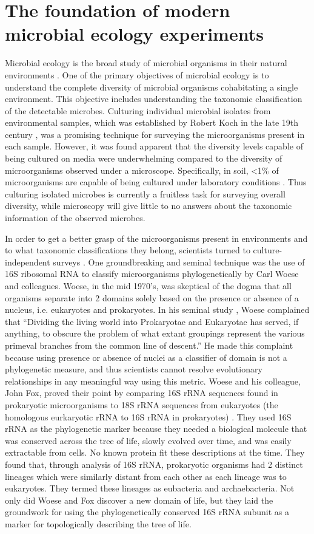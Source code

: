 \section{The foundation of modern microbial ecology experiments}
%
Microbial ecology is the broad study of microbial organisms in their natural environments \cite{Atlas1986}. One of the primary objectives of microbial ecology is to understand the complete diversity of microbial organisms cohabitating a single environment. This objective includes understanding the taxonomic classification of the detectable microbes. Culturing individual microbial isolates from environmental samples, which was established by Robert Koch in the late 19th century \cite{nobel1967}, was a promising technique for surveying the microorganisms present in each sample. However, it was found apparent that the diversity levels capable of being cultured on media were underwhelming compared to the diversity of microorganisms observed under a microscope. Specifically, in soil, <1\% of microorganisms are capable of being cultured under laboratory conditions \cite{Hugenholtz1998}. Thus culturing isolated microbes is currently a fruitless task for surveying overall diversity, while microscopy will give little to no answers about the taxonomic information of the observed microbes. 

In order to get a better grasp of the microorganisms present in environments and to what taxonomic classifications they belong, scientists turned to culture-independent surveys \cite{Hugenholtz1998}. One groundbreaking and seminal technique was the use of 16S ribosomal RNA to classify microorganisms phylogenetically by Carl Woese and colleagues. Woese, in the mid 1970's, was skeptical of the dogma that all organisms separate into 2 domains solely based on the presence or absence of a nucleus, i.e. eukaryotes and prokaryotes. In his seminal study \cite{Woese1977}, Woese complained that ``Dividing the living world into Prokaryotae and Eukaryotae has served, if anything, to obscure the problem of what extant groupings represent the various primeval branches from the common line of descent.'' He made this complaint because using presence or absence of nuclei as a classifier of domain is not a phylogenetic measure, and thus scientists cannot resolve evolutionary relationships in any meaningful way using this metric. Woese and his colleague, John Fox, proved their point by comparing 16S rRNA sequences found in prokaryotic microorganisms to 18S rRNA sequences from eukaryotes (the homologous eurkaryotic rRNA to 16S rRNA in prokaryotes) \cite{Woese1977}. They used 16S rRNA as the phylogenetic marker because they needed a biological molecule that was conserved across the tree of life, slowly evolved over time, and was easily extractable from cells. No known protein fit these descriptions at the time. They found that, through analysis of 16S rRNA, prokaryotic organisms had 2 distinct lineages which were similarly distant from each other as each lineage was to eukaryotes. They termed these lineages as eubacteria and archaebacteria. Not only did Woese and Fox discover a new domain of life, but they laid the groundwork for using the phylogenetically conserved 16S rRNA subunit as a marker for topologically describing the tree of life.

